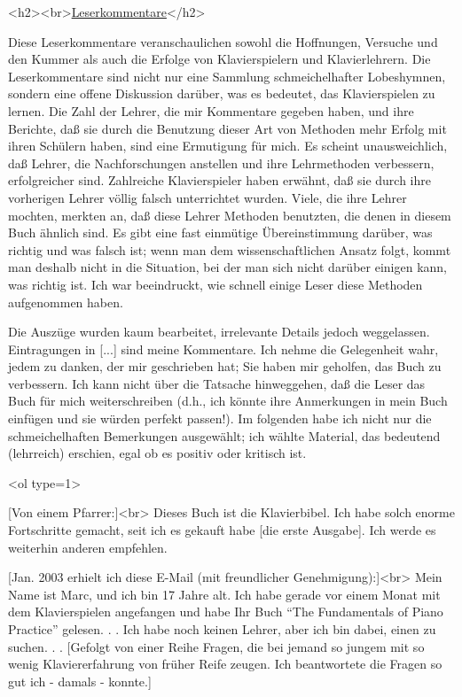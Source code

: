 
\label{testimonials}

<h2><br>\underline{Leserkommentare}</h2>

Diese Leserkommentare veranschaulichen sowohl die Hoffnungen, Versuche und den Kummer als auch die Erfolge von Klavierspielern und Klavierlehrern.
Die Leserkommentare sind nicht nur eine Sammlung schmeichelhafter Lobeshymnen, sondern eine offene Diskussion darüber, was es bedeutet, das Klavierspielen zu lernen.
Die Zahl der Lehrer, die mir Kommentare gegeben haben, und ihre Berichte, daß sie durch die Benutzung dieser Art von Methoden mehr Erfolg mit ihren Schülern haben, sind eine Ermutigung für mich.
Es scheint unausweichlich, daß Lehrer, die Nachforschungen anstellen und ihre Lehrmethoden verbessern, erfolgreicher sind.
Zahlreiche Klavierspieler haben erwähnt, daß sie durch ihre vorherigen Lehrer völlig falsch unterrichtet wurden.
Viele, die ihre Lehrer mochten, merkten an, daß diese Lehrer Methoden benutzten, die denen in diesem Buch ähnlich sind.
Es gibt eine fast einmütige Übereinstimmung darüber, was richtig und was falsch ist; wenn man dem wissenschaftlichen Ansatz folgt, kommt man deshalb nicht in die Situation, bei der man sich nicht darüber einigen kann, was richtig ist.
Ich war beeindruckt, wie schnell einige Leser diese Methoden aufgenommen haben.

Die Auszüge wurden kaum bearbeitet, irrelevante Details jedoch weggelassen.
Eintragungen in [...] sind meine Kommentare.
Ich nehme die Gelegenheit wahr, jedem zu danken, der mir geschrieben hat; Sie haben mir geholfen, das Buch zu verbessern.
Ich kann nicht über die Tatsache hinweggehen, daß die Leser das Buch für mich weiterschreiben (d.h., ich könnte ihre Anmerkungen in mein Buch einfügen und sie würden perfekt passen!).
Im folgenden habe ich nicht nur die schmeichelhaften Bemerkungen ausgewählt; ich wählte Material, das bedeutend (lehrreich) erschien, egal ob es positiv oder kritisch ist.


<ol type=1>

\item \label{testimonials01}
[Von einem Pfarrer:]<br>
Dieses Buch ist die Klavierbibel.
Ich habe solch enorme Fortschritte gemacht, seit ich es gekauft habe [die erste Ausgabe].
Ich werde es weiterhin anderen empfehlen.


\item \label{testimonials02}
[Jan. 2003 erhielt ich diese E-Mail (mit freundlicher Genehmigung):]<br>
Mein Name ist Marc, und ich bin 17 Jahre alt.
Ich habe gerade vor einem Monat mit dem Klavierspielen angefangen und habe Ihr Buch \enquote{The Fundamentals of Piano Practice} gelesen. . .
Ich habe noch keinen Lehrer, aber ich bin dabei, einen zu suchen. . .
[Gefolgt von einer Reihe Fragen, die bei jemand so jungem mit so wenig Klaviererfahrung von früher Reife zeugen.
Ich beantwortete die Fragen so gut ich - damals - konnte.]


